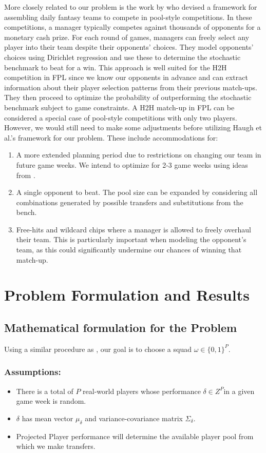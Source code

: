 			More closely related to our problem is the work by \cite{haugh2021play} who devised a framework for assembling daily fantasy teams to compete in pool-style competitions. In these competitions, a manager typically competes against thousands of opponents for a monetary cash prize. For each round of games, managers can freely select any player into their team despite their opponents’ choices. They model opponents’ choices using Dirichlet regression and use these to determine the stochastic benchmark to beat for a win. This approach is well suited for the H2H competition in FPL since we know our opponents in advance and can extract information about their player selection patterns from their previous match-ups. They then proceed to optimize the probability of outperforming the stochastic benchmark subject to game constraints. A H2H match-up in FPL can be considered a special case of pool-style competitions with only two players. However, we would still need to make some adjustments before utilizing Haugh et al.’s framework for our problem. These include accommodations for:
			\begin{enumerate}
				\item[-] A more extended planning period due to restrictions on changing our team in future game weeks. We intend to optimize for 2-3 game weeks using ideas from  \cite{becker2016analytical}.
				\item[-] A single opponent to beat. The pool size can be expanded by considering all combinations generated by possible transfers and substitutions from the bench.
				\item[-] Free-hits and wildcard chips where a manager is allowed to freely overhaul their team. This is particularly important when modeling the opponent’s team, as this could significantly undermine our chances of winning that match-up.
			\end{enumerate}

		\chapter{Problem Formulation and Results} \label{chap:formulation}
			\section{Mathematical formulation for the Problem}
			Using a similar procedure as \cite{haugh2021play}, our goal is to choose a squad   $\omega \in \{0,1\}^P$.

				\subsection{Assumptions:}
					\begin{itemize}
						\item There is a total of $P$ real-world players whose performance   $\delta \in Z^P$in a given game week is random.
						\item $\delta$ has mean vector $\mu_{\delta}$ and variance-covariance matrix $\Sigma_{\delta}$.
						\item Projected Player performance will determine the available player pool from which we make transfers.
					\end{itemize}

